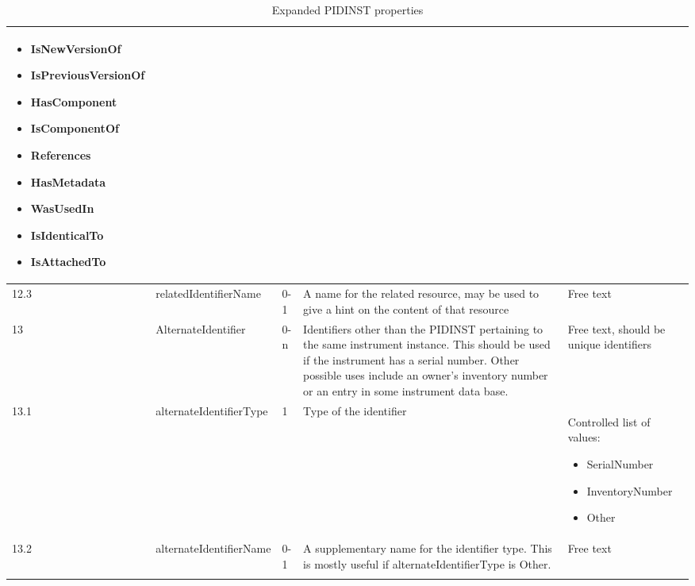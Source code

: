 \documentclass[titlepage=true,twoside=false,DIV=13]{scrartcl}
\begin{document}
\begin{longtable}{|l|l|l|p{}|p{\valcolw}|}
\begin{minipage}[t]{\valcolw}
\begin{itemize}[nosep,leftmargin=3.5ex]
            \item IsNewVersionOf
            \item IsPreviousVersionOf
            \item HasComponent
            \item IsComponentOf
            \item References
            \item HasMetadata
            \item WasUsedIn
            \item IsIdenticalTo
            \item IsAttachedTo
            \end{itemize}
            \vspace{1ex}
          \end{minipage} \\
  \hline
  12.3  & relatedIdentifierName        & 0-1
        & A name for the related resource, may be used to give a hint
          on the content of that resource
        & Free text \\
  \hline
  13    & AlternateIdentifier          & 0-n
        & Identifiers other than the PIDINST pertaining to the same
          instrument instance.  This should be used if the instrument
          has a serial number.  Other possible uses include an owner's
          inventory number or an entry in some instrument data base.
        & Free text, should be unique identifiers \\
  \hline
  13.1  & alternateIdentifierType      & 1
        & Type of the identifier
        & \begin{minipage}[t]{\valcolw}
            Controlled list of values:
            \begin{itemize}[nosep,leftmargin=3.5ex]
            \item SerialNumber
            \item InventoryNumber
            \item Other
            \end{itemize}
            \vspace{1ex}
          \end{minipage} \\
  \hline
  13.2  & alternateIdentifierName      & 0-1
        & A supplementary name for the identifier type.  This is
          mostly useful if alternateIdentifierType is Other.
        & Free text \\
  \hline
  \caption{Expanded PIDINST properties}
  \label{schema:tab:expandprops}
\end{longtable}



\end{document}
